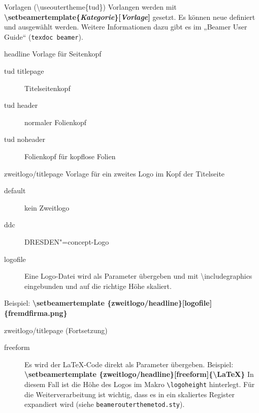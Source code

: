 \documentclass[presentation,t]{beamer}
\begin{document}
\begin{frame}[allowframebreaks]{Vorlagen (\textbackslash useoutertheme\{tud\})}
Vorlangen werden mit 
\textbf{\textbackslash setbeamertemplate\{\emph{Kategorie}\}[\emph{Vorlage}]}
gesetzt. Es können neue
definiert und ausgewählt werden. Weitere Informationen dazu gibt es im
„Beamer User Guide“ (\texttt{texdoc beamer}).
\begin{block}{headline}
Vorlage für Seitenkopf
\begin{description}
\item[{tud titlepage}] Titelseitenkopf
\item[{tud header}] normaler Folienkopf
\item[{tud noheader}] Folienkopf für kopflose Folien
\end{description}
\end{block}

\begin{block}{zweitlogo/titlepage}
Vorlage für ein zweites Logo im Kopf der Titelseite
\begin{description}
\item[{default}] kein Zweitlogo
\item[{ddc}] DRESDEN"=concept-Logo
\item[{logofile}] Eine Logo-Datei wird als Parameter übergeben und mit
\textbackslash includegraphics eingebunden und auf die
richtige Höhe skaliert.
\end{description}
Beispiel: 
\textbf{\textbackslash \mbox{setbeamertemplate} \{zweitlogo/headline\}[logofile]\{fremdfirma.png\}}
\end{block}
\begin{block}{zweitlogo/titlepage (Fortsetzung)}
\begin{description}
\item[{freeform}] Es wird der \LaTeX -Code direkt als Parameter übergeben. Beispiel:
\textbf{\textbackslash \mbox{setbeamertemplate} \{zweitlogo/headline\}[freeform]\{\textbackslash LaTeX\}}
In diesem Fall ist die Höhe des Logos im Makro
\texttt{\textbackslash logoheight} hinterlegt. Für die
Weiterverarbeitung ist wichtig, dass es in ein
skaliertes Register expandiert wird (siehe
\texttt{beamerouterthemetod.sty}).
\end{description}
\end{block}


\end{frame}
\end{document}
